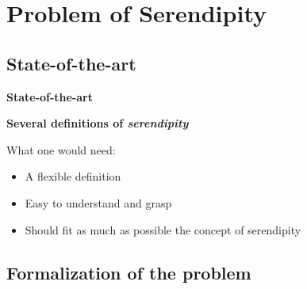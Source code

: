 \documentclass[10pt,frenchb]{beamer}
\begin{document}
\section{Problem of Serendipity}

 \begin{frame}
 \tableofcontents[currentsection]
 \end{frame}

\subsection{State-of-the-art}

\begin{frame}{\textbf{State-of-the-art}} 

\begin{center}
\textbf{Several definitions of \emph{serendipity}}\\
\cite{abbassi2009getting,murakami2007metrics,iaquinta2008introducing,kotkov2016survey}
\end{center}
\pause

What one would need:

\begin{center}
\begin{itemize}
\item A flexible definition %
\item Easy to understand and grasp %
\item Should fit as much as possible the concept of serendipity %
\end{itemize}
\end{center}

\end{frame}

\subsection{Formalization of the problem}
\end{document}
